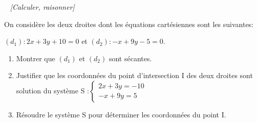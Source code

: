 \exo~ \textit{[Calculer, raisonner]}

On considère les deux droites dont les équations cartésiennes sont les suivantes:

 $(d_1): 2x + 3y +10=0$ et $(d_2): -x+9y-5=0$. 


\begin{enumerate}
\item Montrer que $(d_1)$ et $(d_2)$ sont sécantes.
\item Justifier que les coordonnées du point d'intersection I des deux droites sont solution du système S :$\begin{cases}
2x+3y=-10 \\
-x+9y=5
\end{cases}$
\item Résoudre le système S pour déterminer les coordonnées du point I.

\end{enumerate}





